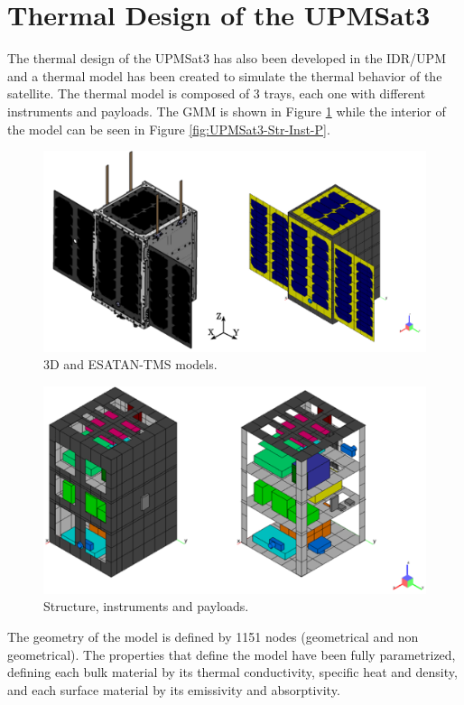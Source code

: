 \section{Thermal Design of the UPMSat3}
The thermal design of the UPMSat3 has also been developed in the IDR/UPM and a thermal model has been created to simulate the thermal behavior of the satellite. The thermal model is composed of 3 trays, each one with different instruments and payloads.  The GMM is shown in Figure \ref{fig:UPMSat3-GMM} while the interior of the model can be seen in  Figure \ref{fig:UPMSat3-Str-Inst-P}.
\begin{figure}[H]
    \centering
    \includegraphics[width = \textwidth]{Figures/UPMSat3/3DandESATAN-TNSmodel.png}
    \caption{3D and ESATAN-TMS models.}
    \label{fig:UPMSat3-GMM}
\end{figure}
\begin{figure}[H]
    \centering
    \includegraphics[width = \textwidth]{Figures/UPMSat3/str-inst-PL ESATANmodels.png}
    \caption{Structure, instruments and payloads.}
    \label{fig:UPMSat3-Str-Inst-PL}
\end{figure}

The geometry of the model is defined by 1151 nodes (geometrical and non geometrical). The properties that define the model have been fully parametrized, defining each bulk material by its thermal conductivity, specific heat and density, and each surface material by its emissivity and absorptivity.



